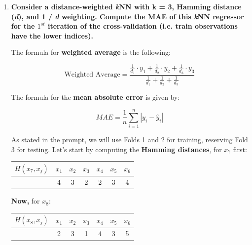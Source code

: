 \documentclass[12pt]{article}
\begin{document}
\begin{enumerate}[leftmargin=\labelsep]
\begin{enumerate}
    \item \textbf{Consider a distance-weighted \textit{k}NN with k = 3, Hamming distance (\textit{d}), and 1 / \textit{d} weighting.
          Compute the MAE of this \textit{k}NN regressor for the $1^{st}$ iteration of the cross-validation (i.e. train
          observations have the lower indices).}

          \vskip 0.3cm

          The formula for \textbf{weighted average} is the following:

          \begin{equation}\label{exI2-a-WA}
            \text{Weighted Average} = \frac{{\frac{1}{{d_1}} \cdot y_1 + \frac{1}{{d_2}} \cdot y_2 + \frac{1}{{d_3}} \cdot y_3}}{{\frac{1}{{d_1}} + \frac{1}{{d_2}} + \frac{1}{{d_3}}}}
          \end{equation}

          
          The formula for the \textbf{mean absolute error} is given by:

          \begin{equation}\label{exI2-a-MAE}
              MAE = \frac{1}{n} \sum_{i=1}^{n} \left| y_i - \hat{y}_i \right|     
          \end{equation}

          As stated in the prompt, we will use Folds 1 and 2 for training, reserving Fold 3 for testing. Let's start by computing
           the \textbf{Hamming distances}, for $x_7$ first:

           \begin{center}
            \begin{tabular}{c|cccccc}
                \(H(x_7,x_j)\)& \(x_1\) & \(x_2\) & \(x_3\) & \(x_4\) & \(x_5\) &\(x_6\) \\
                \hline
                               & 4 & 3 & 2 & 2 & 3 & 4 \\
            \end{tabular}
          \end{center}
          

          \textbf{Now,} for $x_8$:

          \begin{center}
            \begin{tabular}{c|cccccc}
                \(H(x_8,x_j)\)& \(x_1\) & \(x_2\) & \(x_3\) & \(x_4\) & \(x_5\) &\(x_6\) \\
                \hline
                               & 2 & 3 & 1 & 4 & 3 & 5 \\
            \end{tabular}
          \end{center}


\end{enumerate}
\end{enumerate}
\end{document}
